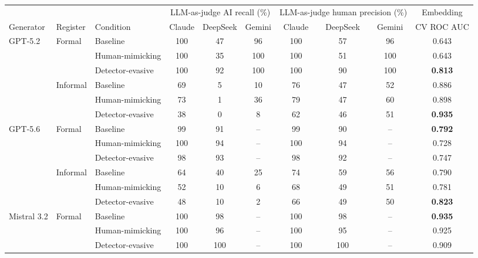 \begin{table}[t]
\captionsetup{font=small}
  \centering
  \small
  \begin{tabular}{lll ccc ccc c}
    \toprule
    & & & \multicolumn{3}{c}{LLM-as-judge AI recall (\%)}
        & \multicolumn{3}{c}{LLM-as-judge human precision (\%)}
        & Embedding \\
    \cmidrule(lr){4-6} \cmidrule(lr){7-9} \cmidrule(l){10}
    Generator & Register & Condition
      & Claude & DeepSeek & Gemini & Claude & DeepSeek & Gemini & CV ROC AUC \\
    \midrule
    \multirow{6}{*}{GPT-5.2}
      & \multirow{3}{*}{Formal}
        & Baseline         & 100 & 47 & 96  & 100 & 57 & 96  & 0.643 \\
      & & Human-mimicking  & 100 & 35 & 100 & 100 & 51 & 100 & 0.643 \\
      & & Detector-evasive & 100 & 92 & 100 & 100 & 90 & 100 & \textbf{0.813} \\
    \cmidrule(l){2-10}
      & \multirow{3}{*}{Informal}
        & Baseline         & 69 & 5 & 10 & 76 & 47 & 52 & 0.886 \\
      & & Human-mimicking  & 73 & 1 & 36 & 79 & 47 & 60 & 0.898 \\
      & & Detector-evasive & 38 & 0 & 8  & 62 & 46 & 51 & \textbf{0.935} \\
    \midrule
    \multirow{6}{*}{GPT-5.6}
      & \multirow{3}{*}{Formal}
        & Baseline         & 99  & 91 & -- & 99  & 90 & -- & \textbf{0.792} \\
      & & Human-mimicking  & 100 & 94 & -- & 100 & 94 & -- & 0.728 \\
      & & Detector-evasive & 98  & 93 & -- & 98  & 92 & -- & 0.747 \\
    \cmidrule(l){2-10}
      & \multirow{3}{*}{Informal}
        & Baseline         & 64 & 40 & 25 & 74 & 59 & 56 & 0.790 \\
      & & Human-mimicking  & 52 & 10 & 6  & 68 & 49 & 51 & 0.781 \\
      & & Detector-evasive & 48 & 10 & 2  & 66 & 49 & 50 & \textbf{0.823} \\
    \midrule
    \multirow{6}{*}{Mistral 3.2}
      & \multirow{3}{*}{Formal}
        & Baseline         & 100 & 98  & -- & 100 & 98  & -- & \textbf{0.935} \\
      & & Human-mimicking  & 100 & 96  & -- & 100 & 95  & -- & 0.925 \\
      & & Detector-evasive & 100 & 100 & -- & 100 & 100 & -- & 0.909 \\

\end{tabular}
\end{table}
